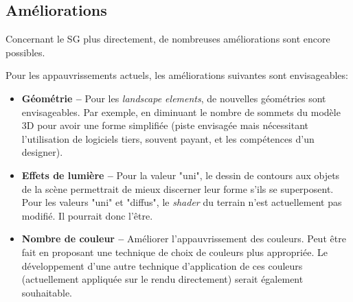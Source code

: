 	\subsection*{Améliorations}
		Concernant le SG plus directement, de nombreuses améliorations sont encore possibles.
		
		Pour les appauvrissements actuels, les améliorations suivantes sont envisageables:
		\begin{itemize}
			\item \textbf{Géométrie --} Pour les \textit{landscape elements}, de nouvelles géométries sont envisageables. Par exemple, en diminuant le nombre de sommets du modèle 3D pour avoir une forme simplifiée (piste envisagée mais nécessitant l'utilisation de logiciels tiers, souvent payant, et les compétences d'un designer). 
			\item \textbf{Effets de lumière --} Pour la valeur "uni", le dessin de contours aux objets de la scène permettrait de mieux discerner leur forme s'ils se superposent. Pour les valeurs "uni" et "diffus", le \textit{shader} du terrain n'est actuellement pas modifié. Il pourrait donc l'être.
			\item \textbf{Nombre de couleur --} Améliorer l'appauvrissement des couleurs. Peut être fait en proposant une technique de choix de couleurs plus appropriée. Le développement d'une autre technique d'application de ces couleurs (actuellement appliquée sur le rendu directement) serait également souhaitable.
		\end{itemize}
		
